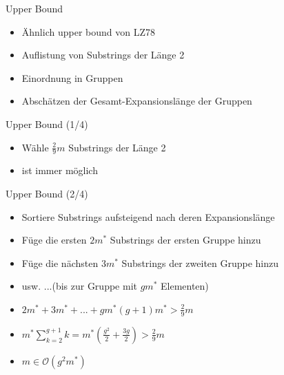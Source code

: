 \begin{frame}{\FrameName}
	\begin{block}{Upper Bound}
    \begin{itemize}[<+->]
      \item Ähnlich upper bound von LZ78
      \item Auflistung von Substrings der Länge 2
      \item Einordnung in Gruppen
      \item Abschätzen der Gesamt-Expansionslänge der Gruppen
    \end{itemize}
\end{block}
\end{frame}

\begin{frame}{\FrameName}
	\begin{block}{Upper Bound (1/4)}
    \begin{itemize}[<+->]
      \item Wähle $\frac{2}{9}m$ Substrings der Länge 2 \linebreak {}
      \item ist immer möglich
    \end{itemize}
\end{block}
\end{frame}

\begin{frame}{\FrameName}
	\begin{block}{Upper Bound (2/4)}
    \begin{itemize}[<+->]
      \item Sortiere Substrings aufsteigend nach deren Expansionslänge
      \item Füge die ersten $2m^*$ Substrings der ersten Gruppe hinzu
      \item Füge die nächsten $3m^*$ Substrings der zweiten Gruppe hinzu
      \item usw. ...(bis zur Gruppe mit $gm^*$ Elementen)
      \item $2m^* + 3m^* + ... + gm^* (g+1)m^* > \frac{2}{9}m$
      \item $m^*\sum_{k=2}^{g+1}k = m^* (\frac{g^2}{2} + \frac{3g}{2}) > \frac{2}{9}m$
      \item $m\in \mathcal{O}(g^2 m^*)$
    \end{itemize}
\end{block}
\end{frame}

